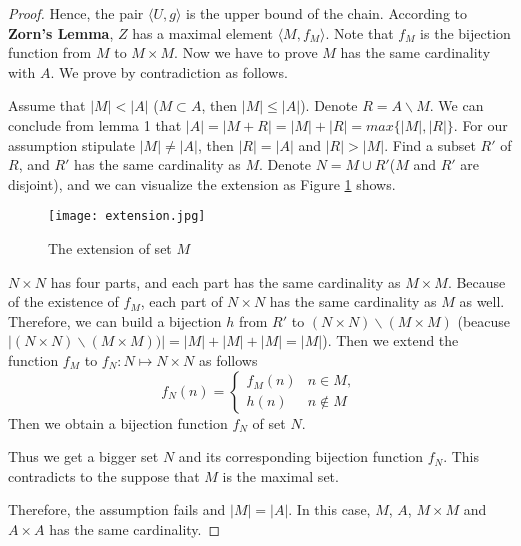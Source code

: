 \documentclass{article}
\begin{document}
\begin{proof}
    Hence, the pair $\langle U, g\rangle$ is the upper bound of the chain.
    According to \textbf{Zorn's Lemma}, $Z$ has a maximal element $\langle M,f_M\rangle $.
    Note that $f_M$ is the bijection function from $M$ to $M\times M.$
    Now we have to prove $M$ has the same cardinality with $A$.
    We prove by contradiction as follows.
    

    Assume that $|M|  < | A| $ ($M\subset A$, then $|M|  \leq |A| $).
    Denote $R = A\backslash M.$ We can conclude from lemma 1 that 
    $| A |= |M+R| =|M| +|R| = max\{|M| ,|R| \}.$ 
    For our assumption stipulate $| M|  \not= |  A| $,
     then $|  R|  = | A| $ and $|  R|  > |  M| .$
    Find a subset $R'$ of $R$, and $R'$ has the same cardinality as $M$.
    Denote $N = M\cup R'$($M$ and $R'$ are disjoint), 
    and we can visualize the extension as Figure \ref{extension} shows.
    \begin{figure}[h]
            \centering
            \texttt{[image: extension.jpg]}
            \caption{The extension of set $M$}
            \label{extension}
        \end{figure}
    $N\times N$ has four parts, and each part has the same cardinality as $M\times M$.
    Because of the existence of $f_M$, each part of $N\times N$ has the same cardinality as $M$ as well.
    Therefore, we can build a bijection $h$ from $R'$ to $(N\times N)\backslash (M\times M)$
    (beacuse $|(N\times N)\backslash (M\times M))| = |M|+|M|+|M| = |M|$).
    Then we extend the function $f_M$ to $f_N: N\mapsto N\times N$ as follows
    \[
        f_N(n) = 
        \begin{cases}
            f_M(n) &  n \in M,\\
            h(n) & n\notin M
        \end{cases}
    \]
        Then we obtain a bijection function $f_N$ of set $N$. 
    
    Thus we get a bigger set $N$ and its corresponding bijection function $f_N$.
    This contradicts to the suppose that  $M$ is the maximal set.

    Therefore, the assumption fails and $|  M|  = |  A| $. In this case, $M$, $A$, $M\times M$
     and $A\times A$ has the same cardinality.
\end{proof}
\end{document}
